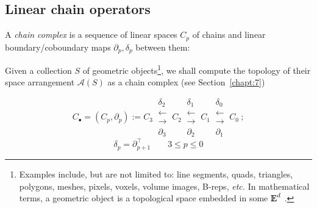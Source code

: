 \subsection{Linear chain operators}\label{sect:3-3-2}

\begin{definition}
A \emph{chain complex} is a sequence of linear spaces \(C_p\) of chains and linear
boundary/coboundary maps \(\partial_p, \delta_p\) between them: 
\end{definition}
Given a collection \(\mathit{S}\) of geometric
objects\footnote{Examples include, but are not limited to: line segments, quads, triangles, polygons, meshes, pixels, voxels, volume images, B-reps, \emph{etc.} 
In mathematical terms, a geometric object is a topological space embedded in some $\mathbb{I\!\!E}^d$ \cite{Edelsbrunner:95}.},
we shall compute the topology of their space
arrangement \(\mathcal{A}(\mathit{S})\) as a chain complex (see Section~\ref{chapt:7})

\[ 
C_\bullet = (C_p, \partial_p) := 
C_3 \ 
\substack{
\delta_2 \\
\longleftarrow \\[-1mm]
\longrightarrow \\
\partial_3 
}
\ C_2 \ 
\substack{
\delta_1 \\
\longleftarrow \\[-1mm]
\longrightarrow \\
\partial_2 
}
\ C_1 \ 
\substack{
\delta_0 \\
\longleftarrow \\[-1mm]
\longrightarrow \\
\partial_1 
}
\ C_0\ ;\] 
\[
\delta_p=\partial_{p+1}^\top\qquad 3\leq p\leq 0
\]





